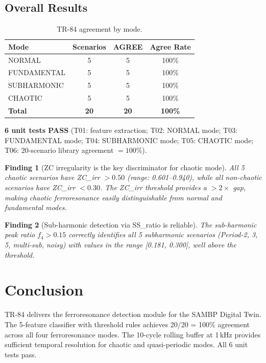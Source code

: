 \documentclass[11pt, a4paper]{article}
\newtheorem{finding}{Finding}
\begin{document}
\subsection{Overall Results}

\begin{table}[ht]
\centering
\caption{TR-84 agreement by mode.}
\label{tab:agree}
\begin{tabular}{lccc}
\toprule
Mode & Scenarios & AGREE & Agree Rate \\
\midrule
NORMAL        & 5 & 5 & 100\% \\
FUNDAMENTAL   & 5 & 5 & 100\% \\
SUBHARMONIC   & 5 & 5 & 100\% \\
CHAOTIC       & 5 & 5 & 100\% \\
\midrule
\textbf{Total} & \textbf{20} & \textbf{20} & \textbf{100\%} \\
\bottomrule
\end{tabular}
\end{table}

\textbf{6 unit tests PASS} (T01: feature extraction; T02: NORMAL mode;
T03: FUNDAMENTAL mode; T04: SUBHARMONIC mode; T05: CHAOTIC mode;
T06: 20-scenario library agreement $= 100\%$).

\begin{finding}[ZC irregularity is the key discriminator for chaotic mode]
All 5 chaotic scenarios have ZC\_irr $> 0.50$ (range: 0.601--0.940),
while all non-chaotic scenarios have ZC\_irr $< 0.30$.
The ZC\_irr threshold provides a $> 2\times$ gap, making chaotic
ferroresonance easily distinguishable from normal and fundamental modes.
\end{finding}

\begin{finding}[Sub-harmonic detection via SS\_ratio is reliable]
The sub-harmonic peak ratio $f_4 > 0.15$ correctly identifies all
5 subharmonic scenarios (Period-2, 3, 5, multi-sub, noisy) with
values in the range [0.181, 0.300], well above the threshold.
\end{finding}

\section{Conclusion}
\label{sec:conclusion}

TR-84 delivers the ferroresonance detection module for the SAMBP Digital Twin.
The 5-feature classifier with threshold rules achieves 20/20 = 100\% agreement
across all four ferroresonance modes. The 10-cycle rolling buffer at 1\,kHz
provides sufficient temporal resolution for chaotic and quasi-periodic modes.
All 6 unit tests pass.
\end{document}
